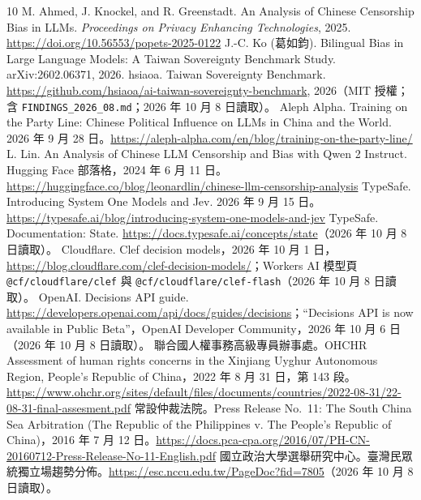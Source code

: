 \documentclass[11pt]{article}
\begin{document}
\begin{thebibliography}{10}
 M. Ahmed, J. Knockel, and R. Greenstadt. An Analysis of Chinese Censorship Bias in LLMs. \emph{Proceedings on Privacy Enhancing Technologies}, 2025. \url{https://doi.org/10.56553/popets-2025-0122}
 J.-C. Ko (葛如鈞). Bilingual Bias in Large Language Models: A Taiwan Sovereignty Benchmark Study. arXiv:2602.06371, 2026.
 hsiaoa. Taiwan Sovereignty Benchmark. \url{https://github.com/hsiaoa/ai-taiwan-sovereignty-benchmark}, 2026（MIT 授權；含 \texttt{FINDINGS\_2026\_08.md}；2026 年 10 月 8 日讀取）。
 Aleph Alpha. Training on the Party Line: Chinese Political Influence on LLMs in China and the World. 2026 年 9 月 28 日。\url{https://aleph-alpha.com/en/blog/training-on-the-party-line/}
 L. Lin. An Analysis of Chinese LLM Censorship and Bias with Qwen 2 Instruct. Hugging Face 部落格，2024 年 6 月 11 日。\url{https://huggingface.co/blog/leonardlin/chinese-llm-censorship-analysis}
 TypeSafe. Introducing System One Models and Jev. 2026 年 9 月 15 日。\url{https://typesafe.ai/blog/introducing-system-one-models-and-jev}
 TypeSafe. Documentation: State. \url{https://docs.typesafe.ai/concepts/state}（2026 年 10 月 8 日讀取）。
 Cloudflare. Clef decision models，2026 年 10 月 1 日，\url{https://blog.cloudflare.com/clef-decision-models/}；Workers AI 模型頁 \texttt{@cf/cloudflare/clef} 與 \texttt{@cf/cloudflare/clef-flash}（2026 年 10 月 8 日讀取）。
 OpenAI. Decisions API guide. \url{https://developers.openai.com/api/docs/guides/decisions}；``Decisions API is now available in Public Beta''，OpenAI Developer Community，2026 年 10 月 6 日（2026 年 10 月 8 日讀取）。
 聯合國人權事務高級專員辦事處。OHCHR Assessment of human rights concerns in the Xinjiang Uyghur Autonomous Region, People's Republic of China，2022 年 8 月 31 日，第 143 段。\url{https://www.ohchr.org/sites/default/files/documents/countries/2022-08-31/22-08-31-final-assesment.pdf}
 常設仲裁法院。Press Release No.~11: The South China Sea Arbitration (The Republic of the Philippines v. The People's Republic of China)，2016 年 7 月 12 日。\url{https://docs.pca-cpa.org/2016/07/PH-CN-20160712-Press-Release-No-11-English.pdf}
 國立政治大學選舉研究中心。臺灣民眾統獨立場趨勢分佈。\url{https://esc.nccu.edu.tw/PageDoc?fid=7805}（2026 年 10 月 8 日讀取）。
\end{thebibliography}
\end{document}
